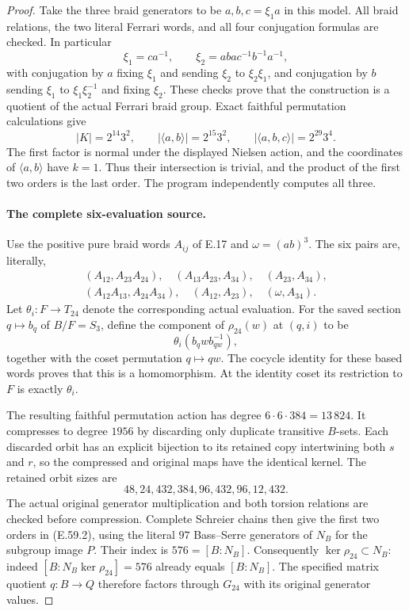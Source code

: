 \begin{proof}
Take the three braid generators to be $a,b,c=\xi_1a$ in this model.
All braid relations, the two literal Ferrari words, and all four
conjugation formulas are checked. In particular
\[
 \xi_1=ca^{-1},\qquad
 \xi_2=abac^{-1}b^{-1}a^{-1},
 \tag{E.59.9}
\]
with conjugation by $a$ fixing $\xi_1$ and sending $\xi_2$ to
$\xi_2\xi_1$, and conjugation by $b$ sending $\xi_1$ to
$\xi_1\xi_2^{-1}$ and fixing $\xi_2$. These checks prove that
the construction is a quotient of the actual Ferrari braid group.
Exact faithful permutation calculations give
\[
 |K|=2^{14}3^2,
 \qquad |\langle a,b\rangle|=2^{15}3^2,
 \qquad |\langle a,b,c\rangle|=2^{29}3^4.
 \tag{E.59.10}
\]
The first factor is normal under the displayed Nielsen action, and
the coordinates of $\langle a,b\rangle$ have $k=1$. Thus their
intersection is trivial, and the product of the first two orders
is the last order. The program independently computes all three.

\paragraph{The complete six-evaluation source.}
Use the positive pure braid words $A_{ij}$ of E.17 and
$\omega=(ab)^3$. The six pairs are, literally,
\[
 \begin{gathered}
 (A_{12},A_{23}A_{24}),\quad(A_{13}A_{23},A_{34}),\quad
 (A_{23},A_{34}),\\
 (A_{12}A_{13},A_{24}A_{34}),\quad(A_{12},A_{23}),\quad
 (\omega,A_{34}).
 \end{gathered}
 \tag{E.59.11}
\]
Let $\theta_i:F\to T_{24}$ denote the corresponding actual
evaluation. For the saved section $q\mapsto b_q$ of $B/F=S_3$,
define the component of $\rho_{24}(w)$ at $(q,i)$ to be
\[
          \theta_i(b_qwb_{qw}^{-1}),
 \tag{E.59.12}
\]
together with the coset permutation $q\mapsto qw$. The cocycle
identity for these based words proves that this is a homomorphism.
At the identity coset its restriction to $F$ is exactly $\theta_i$.

The resulting faithful permutation action has degree
$6\cdot6\cdot384=13\,824$. It compresses to degree $1956$ by
discarding only duplicate transitive $B$-sets. Each discarded orbit
has an explicit bijection to its retained copy intertwining both
$s$ and $r$, so the compressed and original maps have the identical
kernel. The retained orbit sizes are
\[
              48,24,432,384,96,432,96,12,432.
 \tag{E.59.13}
\]
The actual original generator multiplication and both torsion
relations are checked before compression. Complete Schreier chains
then give the first two orders in \textup{(E.59.2)}, using the literal
$97$ Bass--Serre generators of $N_B$ for the subgroup image $P$.
Their index is $576=[B:N_B]$. Consequently $\ker\rho_{24}\subset N_B$:
indeed $[B:N_B\ker\rho_{24}]=576$ already equals $[B:N_B]$.
The specified matrix quotient $q:B\to Q$ therefore factors through
$G_{24}$ with its original generator values.


\end{proof}
